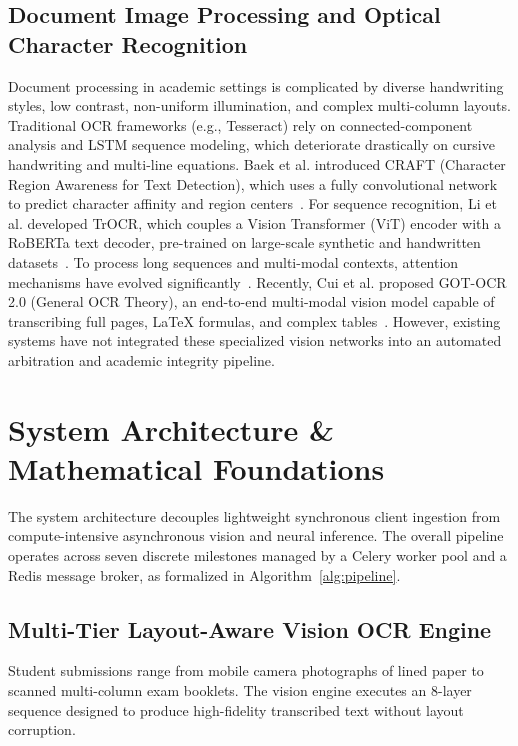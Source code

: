\documentclass[journal]{IEEEtran}
\begin{document}
\subsection{Document Image Processing and Optical Character Recognition}
Document processing in academic settings is complicated by diverse handwriting styles, low contrast, non-uniform illumination, and complex multi-column layouts. Traditional OCR frameworks (e.g., Tesseract) rely on connected-component analysis and LSTM sequence modeling, which deteriorate drastically on cursive handwriting and multi-line equations. Baek et al. introduced CRAFT (Character Region Awareness for Text Detection), which uses a fully convolutional network to predict character affinity and region centers~\cite{baek2019character}. For sequence recognition, Li et al. developed TrOCR, which couples a Vision Transformer (ViT) encoder with a RoBERTa text decoder, pre-trained on large-scale synthetic and handwritten datasets~\cite{li2022trocr}. To process long sequences and multi-modal contexts, attention mechanisms have evolved significantly~\cite{zaheer2020big}. Recently, Cui et al. proposed GOT-OCR 2.0 (General OCR Theory), an end-to-end multi-modal vision model capable of transcribing full pages, \LaTeX{} formulas, and complex tables~\cite{cui2024got}. However, existing systems have not integrated these specialized vision networks into an automated arbitration and academic integrity pipeline.

\section{System Architecture \& Mathematical Foundations}

The system architecture decouples lightweight synchronous client ingestion from compute-intensive asynchronous vision and neural inference. The overall pipeline operates across seven discrete milestones managed by a Celery worker pool and a Redis message broker, as formalized in Algorithm~\ref{alg:pipeline}.

\subsection{Multi-Tier Layout-Aware Vision OCR Engine}
Student submissions range from mobile camera photographs of lined paper to scanned multi-column exam booklets. The vision engine executes an 8-layer sequence designed to produce high-fidelity transcribed text without layout corruption.
\end{document}
